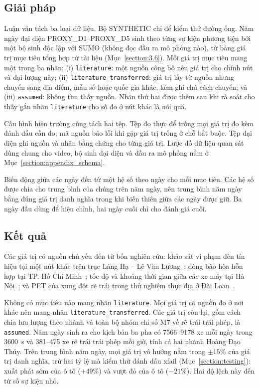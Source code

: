 \documentclass[../main.tex]{subfiles}
\begin{document}
\subsection{Giải pháp}

Luận văn tách ba loại dữ liệu. Bộ SYNTHETIC chỉ để kiểm thử đường ống. Năm ngày đại diện PROXY\_D1--PROXY\_D5 sinh theo từng sự kiện phương tiện bởi một bộ sinh độc lập với SUMO (không đọc đầu ra mô phỏng nào), từ bảng giá trị mục tiêu tổng hợp từ tài liệu (Mục~\ref{section:3.6}). Mỗi giá trị mục tiêu mang một trong ba nhãn: (i) \texttt{literature}: một nguồn công bố nêu giá trị cho chính nút và đại lượng này; (ii) \texttt{literature\_transferred}: giá trị lấy từ nguồn nhưng chuyển sang địa điểm, mẫu số hoặc quốc gia khác, kèm ghi chú cách chuyển; và (iii) \texttt{assumed}: không tìm thấy nguồn.
Nhãn thứ hai được thêm sau khi rà soát cho thấy gắn nhãn \texttt{literature} cho số đo ở nút khác là nói quá.

Cấu hình hiện trường cũng tách hai tệp. Tệp đo thực để trống mọi giá trị đo kèm đánh dấu cần đo; mã nguồn báo lỗi khi gặp giá trị trống ở chỗ bắt buộc. Tệp đại diện ghi nguồn và nhãn bằng chứng cho từng giá trị. Lược đồ dữ liệu quan sát dùng chung cho video, bộ sinh đại diện và đầu ra mô phỏng nằm ở Mục~\ref{section:appendix_schema}.

Biến động giữa các ngày đến từ một hệ số theo ngày cho mỗi mục tiêu. Các hệ số được chia cho trung bình của chúng trên năm ngày, nên trung bình năm ngày bằng đúng giá trị danh nghĩa trong khi biến thiên giữa các ngày được giữ. Ba ngày đầu dùng để hiệu chỉnh, hai ngày cuối chỉ cho đánh giá cuối.

\subsection{Kết quả}

Các giá trị có nguồn chủ yếu đến từ bốn nghiên cứu: khảo sát vi phạm đèn tín hiệu tại một nút khác trên trục Láng Hạ -- Lê Văn Lương~\cite{mai2019signal}; dòng bão hòa hỗn hợp tại TP. Hồ Chí Minh~\cite{vu2015saturation}; tốc độ và khoảng thời gian giữa các xe máy tại Hà Nội~\cite{chu2005speed}; và PET của xung đột rẽ trái trong thử nghiệm thực địa ở Đài Loan~\cite{hsu2024v2x}.

Không có mục tiêu nào mang nhãn \texttt{literature}. Mọi giá trị có nguồn đo ở nơi khác nên mang nhãn \texttt{literature\_transferred}. Các giá trị còn lại, gồm cách chia lưu lượng theo nhánh và toàn bộ nhóm chỉ số M7 về rẽ trái trái phép, là \texttt{assumed}. Năm ngày sinh ra cho kịch bản ba pha có 7566--9178 xe mỗi ngày trong 3600~s và 381--475 xe rẽ trái trái phép mỗi giờ, tính cả hai nhánh Hoàng Đạo Thúy. Trên trung bình năm ngày, mọi giá trị vô hướng nằm trong $\pm 15\%$ của giá trị danh nghĩa, trừ hai tỷ lệ mà kiểm thử đánh dấu xfail (Mục~\ref{section:testing}): xuất phát sớm của ô tô ($+49\%$) và vượt đỏ của ô tô ($-21\%$). Hai độ lệch này đến từ số sự kiện nhỏ.
\end{document}
